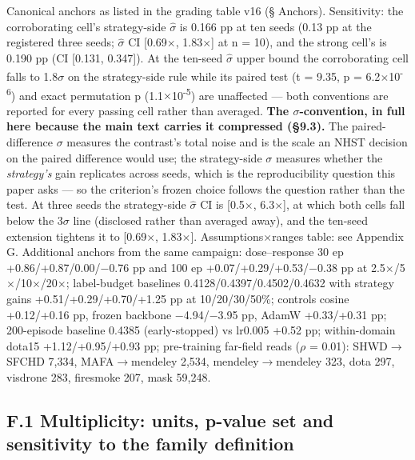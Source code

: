 \documentclass[pdflatex,sn-mathphys-ay]{sn-jnl}
\begin{document}
Canonical anchors as listed in the grading table v16 (\S{} Anchors). Sensitivity: the corroborating cell's strategy-side $\hat{\sigma}$ is 0.166 pp at ten seeds (0.13 pp at the registered three seeds; $\hat{\sigma}$ CI [0.69\ensuremath{\times}, 1.83\ensuremath{\times}] at n = 10), and the strong cell's is 0.190 pp (CI [0.131, 0.347]). At the ten-seed $\hat{\sigma}$ upper bound the corroborating cell falls to 1.8\ensuremath{\sigma} on the strategy-side rule while its paired test (t = 9.35, p = 6.2\ensuremath{\times}10\textsuperscript{-6}) and exact permutation p (1.1\ensuremath{\times}10\textsuperscript{-5}) are unaffected --- both conventions are reported for every passing cell rather than averaged. \textbf{The \ensuremath{\sigma}-convention, in full here because the main text carries it compressed (\S{}9.3).} The paired-difference \ensuremath{\sigma} measures the contrast's total noise and is the scale an NHST decision on the paired difference would use; the strategy-side \ensuremath{\sigma} measures whether the \emph{strategy's} gain replicates across seeds, which is the reproducibility question this paper asks --- so the criterion's frozen choice follows the question rather than the test. At three seeds the strategy-side $\hat{\sigma}$ CI is [0.5\ensuremath{\times}, 6.3\ensuremath{\times}], at which both cells fall below the 3\ensuremath{\sigma} line (disclosed rather than averaged away), and the ten-seed extension tightens it to [0.69\ensuremath{\times}, 1.83\ensuremath{\times}]. Assumptions\ensuremath{\times}ranges table: see Appendix G. Additional anchors from the same campaign: dose--response 30 ep +0.86/+0.87/0.00/\ensuremath{-}0.76 pp and 100 ep +0.07/+0.29/+0.53/\ensuremath{-}0.38 pp at 2.5\ensuremath{\times}/5\ensuremath{\times}/10\ensuremath{\times}/20\ensuremath{\times}; label-budget baselines 0.4128/0.4397/0.4502/0.4632 with strategy gains +0.51/+0.29/+0.70/+1.25 pp at 10/20/30/50\%; controls cosine +0.12/+0.16 pp, frozen backbone \ensuremath{-}4.94/\ensuremath{-}3.95 pp, AdamW +0.33/+0.31 pp; 200-episode baseline 0.4385 (early-stopped) vs lr0.005 +0.52 pp; within-domain dota15 +1.12/+0.95/+0.93 pp; pre-training far-field reads (\ensuremath{\rho} = 0.01): SHWD\ensuremath{\rightarrow}SFCHD 7,334, MAFA\ensuremath{\rightarrow}mendeley 2,534, mendeley\ensuremath{\rightarrow}mendeley 323, dota 297, visdrone 283, firesmoke 207, mask 59,248.

\subsection*{F.1 Multiplicity: units, p-value set and sensitivity to the family definition}
\end{document}

